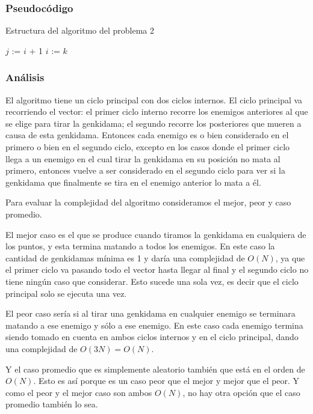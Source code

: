 \newpage
\subsubsection{Pseudocódigo}
\begin{algorithm}[h]
\caption{Estructura del algoritmo del problema 2}
\begin{algorithmic}[1]
		$j$ := $i$ + 1
		\EndWhile
		\EndWhile
		$i$ := $k$
	\EndFor
	\EndFor
	\EndFunction
\end{algorithmic}
\end{algorithm}


\subsubsection{Análisis}
El algoritmo tiene un ciclo principal con dos ciclos internos. El ciclo principal va recorriendo el vector: el primer ciclo interno recorre los enemigos anteriores al que se elige para tirar la genkidama; el segundo recorre los posteriores que mueren a causa de esta genkidama. Entonces cada enemigo es o bien considerado en el primero o bien en el segundo ciclo, excepto en los casos donde el primer ciclo llega a un enemigo en el cual tirar la genkidama en su posición no mata al primero, entonces vuelve a ser considerado en el segundo ciclo para ver si la genkidama que finalmente se tira en el enemigo anterior lo mata a él.

Para evaluar la complejidad del algoritmo consideramos el mejor, peor y caso promedio.

El mejor caso es el que se produce cuando tiramos la genkidama en cualquiera de los puntos, y esta termina matando a todos los enemigos. En este caso la cantidad de genkidamas mínima es 1 y daría una complejidad de $O(N)$, ya que el primer ciclo va pasando todo el vector hasta llegar al final y el segundo ciclo no tiene ningún caso que considerar. Esto sucede una sola vez, es decir que el ciclo principal solo se ejecuta una vez.

El peor caso sería si al tirar una genkidama en cualquier enemigo se terminara matando a ese enemigo y sólo a ese enemigo. En este caso cada enemigo termina siendo tomado en cuenta en ambos ciclos internos y en el ciclo principal, dando una complejidad de $O(3N) = O(N)$.

Y el caso promedio que es simplemente aleatorio también que está en el orden de $O(N)$. Esto es así porque es un caso peor que el mejor y mejor que el peor. Y como el peor y el mejor caso son ambos $O(N)$, no hay otra opción que el caso promedio también lo sea.